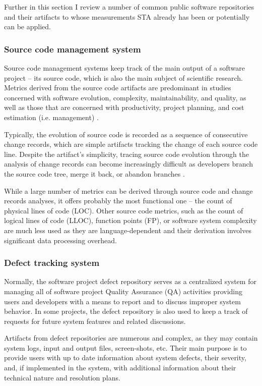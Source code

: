 Further in this section I review a number of common public software repositories and their artifacts to whose measurements 
STA already has been or potentially can be applied. 

\subsubsection{Source code management system}
Source code management systems keep track of the main output of a software project -- its source code, which is also the 
main subject of scientific research. Metrics derived from the source code artifacts are predominant in studies concerned 
with software evolution, complexity, maintainability, and quality, as well as those that are concerned with productivity, 
project planning, and cost estimation (i.e. management) \cite{citeulike:4534888}. 

Typically, the evolution of source code is recorded as a sequence of consecutive change records, which are simple artifacts
tracking the change of each source code line. Despite the artifact's simplicity, tracing source code evolution through 
the analysis of change records can become increasingly difficult as developers branch the source code tree, merge it back, 
or abandon branches \cite{citeulike:13156191}.

While a large number of metrics can be derived through source code and change records analyses, it offers probably 
the most functional one -- the count of physical lines of code (LOC). Other source code metrics, such as the count of logical lines 
of code (LLOC), function points (FP), or software system complexity are much less used as they are language-dependent and their 
derivation involves significant data processing overhead.

\subsubsection{Defect tracking system}
Normally, the software project defect repository serves as a centralized system for managing all of software project 
Quality Assurance (QA) activities providing users and developers with a means to report and to discuss improper system 
behavior.
In some projects, the defect repository is also used to keep a track of requests for future system features and related
discussions.

Artifacts from defect repositories are numerous and complex, as they may contain system logs, input and output files, 
screen-shots, etc. Their main purpose is to provide users with up to date information about system defects, their severity, 
and, if implemented in the system, with additional information about their technical nature and resolution plans.

